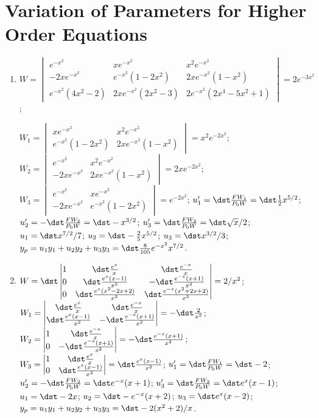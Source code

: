 \documentclass[openany]{book}
\newenvironment{sectionSolutions}{
 \begin{enumerate}[item-label={\thesection.\arabic{enumi}.}]
}{
 \end{enumerate}
}
\begin{document}
\section{Variation of Parameters for Higher Order  Equations}

\begin{sectionSolutions}
\item
$W=\begin{vmatrix}
e^{-x^2}&xe^{-x^2}&x^2e^{-x^2}\\
-2xe^{-x^2}&e^{-x^2}(1-2x^2)&2x
e^{-x^2}(1-x^2)\\
e^{-x^2}(4x^2-2)&2xe^{-x^2}(2x^2-3)&2e^{-x^2}(2x^4-5x^2+1)
\end{vmatrix}=2e^{-3x^2}$;

$W_1=\begin{vmatrix}
xe^{-x^2}&x^2e^{-x^2}\\
e^{-x^2}(1-2x^2)&2xe^{-x^2}(1-x^2)
\end{vmatrix}=x^2e^{-2x^2}$;
$W_2=\begin{vmatrix}
e^{-x^2}&x^2e^{-x^2}\\
-2xe^{-x^2}&2xe^{-x^2}(1-x^2)
\end{vmatrix}=2xe^{-2x^2}$;
$W_3=\begin{vmatrix}
e^{-x^2}&xe^{-x^2}\\
-2xe^{-x^2}&e^{-x^2}(1-2x^2)
\end{vmatrix}=e^{-2x^2}$;
$u_1'=\dst\frac{FW_1}{ P_0W}=\dst \frac{1}{2}x^{5/2}$;
$u_2'=-\dst\frac{FW_2}{ P_0W}=\dst -x^{3/2}$;
$u_3'=\dst\frac{FW_2}{ P_0W}=\dst \sqrt{x}/2$;
$u_1=\dst x^{7/2}/7$;
$u_2=\dst -\frac{2}{5}x^{5/2}$;
$u_3=\dst x^{3/2}/3$;
$y_p=u_1y_1+u_2y_2+u_3y_3=\dst \frac{8}{105}e^{-x^2}x^{7/2}$.


\item
$W=\dst\begin{vmatrix}
1&\dst\frac{e^x}{ x}&\dst\frac{e^{-x}}{ x}\\
0&\dst\frac{e^x(x-1)}{ x^2}&-\dst\frac{e^{-x}(x+1)}{ x^2}\\
0&\dst\frac{e^x(x^2-2x+2)}{ x^3}&\dst\frac{e^{-x}(x^2+2x+2)}{ x^3}
\end{vmatrix}=2/x^2$;
$W_1=\begin{vmatrix}
\dst\frac{e^x}{ x}&\dst\frac{e^{-x}}{ x}
\\\dst\frac{e^x(x-1)}{ x^2}&-\dst\frac{e^{-x}(x+1)}{ x^2}
\end{vmatrix}=-\dst\frac{2}{ x^2}$;
$W_2=
\begin{vmatrix}1&\dst\frac{e^{-x}}{ x}\\
0&-\dst\frac{e^{-x}(x+1)}{ x^2}
\end{vmatrix}=-\dst\frac{e^{-x}(x+1)}{ x^2}$;
$W_3=\begin{vmatrix}
1&\dst\frac{e^x}{ x}\\
0&\dst\frac{e^x(x-1)}{ x^2}
\end{vmatrix}=\dst\frac{e^x(x-1)}{ x^2}$;
$u_1'=\dst\frac{FW_1}{ P_0W}=\dst -2$;
$u_2'=-\dst\frac{FW_2}{ P_0W}=\dst e^{-x}(x+1)$;
$u_3'=\dst\frac{FW_2}{ P_0W}=\dst e^x(x-1)$;
$u_1=\dst -2x$;
$u_2=\dst -e^{-x}(x+2)$;
$u_3=\dst e^x(x-2)$;
$y_p=u_1y_1+u_2y_2+u_3y_3=\dst -2(x^2+2)/x$.




\end{sectionSolutions}
\end{document}
